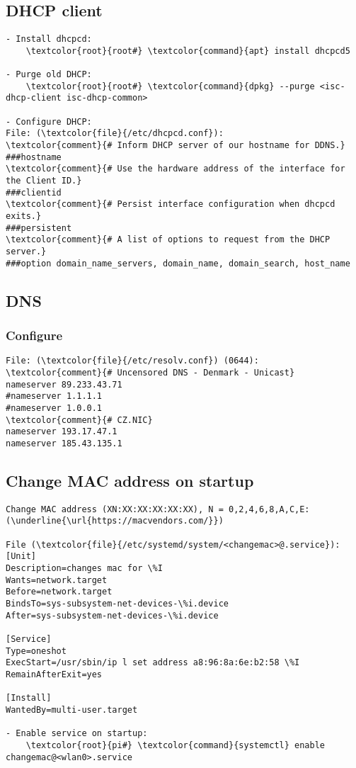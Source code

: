 \documentclass[10pt, a4paper, onecolumn, openany]{book} %
\begin{document}
\subsection{DHCP client}
\begin{Verbatim}[commandchars=\\\{\}]
- Install dhcpcd:
    \textcolor{root}{root#} \textcolor{command}{apt} install dhcpcd5

- Purge old DHCP:
    \textcolor{root}{root#} \textcolor{command}{dpkg} --purge <isc-dhcp-client isc-dhcp-common>
    
- Configure DHCP:
File: (\textcolor{file}{/etc/dhcpcd.conf}):
\textcolor{comment}{# Inform DHCP server of our hostname for DDNS.}
###hostname
\textcolor{comment}{# Use the hardware address of the interface for the Client ID.}
###clientid
\textcolor{comment}{# Persist interface configuration when dhcpcd exits.}
###persistent
\textcolor{comment}{# A list of options to request from the DHCP server.}
###option domain_name_servers, domain_name, domain_search, host_name
\end{Verbatim}
\subsection{DNS}
\subsubsection{Configure}
\begin{Verbatim}[commandchars=\\\{\}]
File: (\textcolor{file}{/etc/resolv.conf}) (0644):
\textcolor{comment}{# Uncensored DNS - Denmark - Unicast}
nameserver 89.233.43.71
#nameserver 1.1.1.1
#nameserver 1.0.0.1
\textcolor{comment}{# CZ.NIC}
nameserver 193.17.47.1
nameserver 185.43.135.1
\end{Verbatim}

\subsection{Change MAC address on startup}
\begin{Verbatim}[commandchars=\\\{\}]
Change MAC address (XN:XX:XX:XX:XX:XX), N = 0,2,4,6,8,A,C,E:
(\underline{\url{https://macvendors.com/}})

File (\textcolor{file}{/etc/systemd/system/<changemac>@.service}):
[Unit]
Description=changes mac for \%I
Wants=network.target
Before=network.target
BindsTo=sys-subsystem-net-devices-\%i.device
After=sys-subsystem-net-devices-\%i.device

[Service]
Type=oneshot
ExecStart=/usr/sbin/ip l set address a8:96:8a:6e:b2:58 \%I
RemainAfterExit=yes

[Install]
WantedBy=multi-user.target

- Enable service on startup:
    \textcolor{root}{pi#} \textcolor{command}{systemctl} enable changemac@<wlan0>.service
\end{Verbatim}
\end{document}
